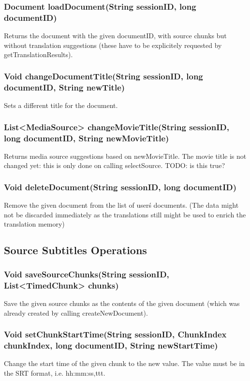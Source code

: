 \subsubsection{Document loadDocument(String sessionID, long documentID)}
Returns the document with the given documentID, with source chunks but without translation suggestions (these have to be explicitely requested by getTranslationResults).

\subsubsection{Void changeDocumentTitle(String sessionID, long documentID, String newTitle)}
Sets a different title for the document.

\subsubsection{List<MediaSource> changeMovieTitle(String sessionID, long documentID, String newMovieTitle)}
Returns media source suggestions based on newMovieTitle.
The movie title is not changed yet:
this is only done on calling selectSource.
TODO: is this true?     	 
     	
\subsubsection{Void deleteDocument(String sessionID, long documentID)}
Remove the given document from the list of user\'s documents.
(The data might not be discarded immediately
as the translations still might be used to enrich the translation memory)	 

\subsection{Source Subtitles Operations}

\subsubsection{Void saveSourceChunks(String sessionID, List<TimedChunk> chunks)}
Save the given source chunks as the contents of the given document
(which was already created by calling createNewDocument).

\subsubsection{Void setChunkStartTime(String sessionID, ChunkIndex chunkIndex, long documentID, String newStartTime)}
Change the start time of the given chunk to the new value. The value must be in the SRT format, i.e. hh:mm:ss,ttt.

